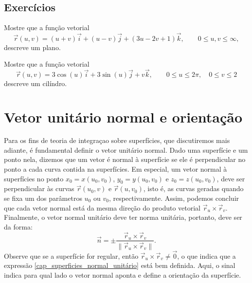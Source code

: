  \subsection*{Exercícios}
 \begin{exer}Mostre que a função vetorial
  $$
  \vec{r}(u,v)=(u+v)\vec{i}+(u-v)\vec{j}+(3u-2v+1)\vec{k}, \qquad 0\leq u,v\leq \infty,
  $$
  descreve um plano.
 \end{exer}

 \begin{exer}Mostre que a função vetorial
  $$
  \vec{r}(u,v)=3\cos(u)\vec{i}+3\sin(u)\vec{j} +v\vec{k}, \qquad 0\leq u\leq 2\pi,\quad 0\leq v\leq 2
  $$
  descreve um cilíndro.
 \end{exer}
 
 
\section{Vetor unitário normal e orientação}
Para os fins de teoria de integraçao sobre superfícies, que discutiremos mais adiante, é fundamental definir o vetor unitário normal. Dado uma superfície e um ponto nela, dizemos que um vetor é normal à superfície se ele é perpendicular no ponto a cada curva contida na superfícies. Em especial, um vetor normal à superfícies no ponto $x_0=x(u_0,v_0)$, $y_0=y(u_0,v_0)$ e $z_0=z(u_0,v_0)$, deve ser perpendicular às curvas $\vec{r}(u_0,v)$ e $\vec{r}(u,v_0)$, isto é, as curvas geradas quando se fixa um dos parâmetros $u_0$ ou $v_0$, respectivamente. Assim, podemos concluir que cada vetor normal está da mesma direção do produto vetorial $\vec{r}_u\times\vec{r}_v$. Finalmente, o vetor normal unitário deve ter norma unitária, portanto, deve ser da forma:
\begin{equation}\label{cap_superficies_normal_unitário}
 \vec{n} = \pm \frac{\vec{r}_u\times\vec{r}_v}{\|\vec{r}_u\times\vec{r}_v\|}.
\end{equation}
Observe que se a superfície for regular, então $\vec{r}_u\times\vec{r}_v\neq \vec{0}$, o que indica que a expressão \eqref{cap_superficies_normal_unitário} está bem definida. Aqui, o sinal indica para qual lado o vetor normal aponta e define a orientação da superfície. 

